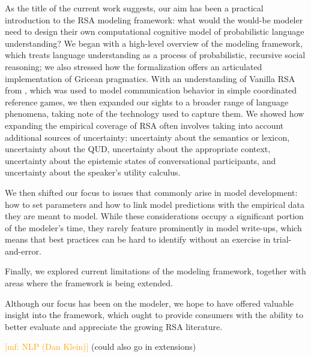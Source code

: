 \documentclass{sp}
\newcommand{\mf}[1]{\textcolor{orange}{[mf: #1]}}
\begin{document}
As the title of the current work suggests, our aim has been a practical introduction to the RSA modeling framework: what would the would-be modeler need to design their own computational cognitive model of probabilistic language understanding? We began with a high-level overview of the modeling framework, which treats language understanding as a process of probabilistic, recursive social reasoning; we also stressed how the formalization offers an articulated implementation of Gricean pragmatics. With an understanding of Vanilla RSA from \cite{frankgoodman2012}, which was used to model communication behavior in simple coordinated reference games, we then expanded our sights to a broader range of language phenomena, taking note of the technology used to capture them. We showed how expanding the empirical coverage of RSA often involves taking into account additional sources of uncertainty: uncertainty about the semantics or lexicon, uncertainty about the QUD, uncertainty about the appropriate context, uncertainty about the epistemic states of conversational participants, and uncertainty about the speaker's utility calculus.

We then shifted our focus to issues that commonly arise in model development: how to set parameters and how to link model predictions with the empirical data they are meant to model. While these considerations occupy a significant portion of the modeler's time, they rarely feature prominently in model write-ups, which means that best practices can be hard to identify without an exercise in trial-and-error.

Finally, we explored current limitations of the modeling framework, together with areas where the framework is being extended.

Although our focus has been on the modeler, we hope to have offered valuable insight into the framework, which ought to provide consumers with the ability to better evaluate and appreciate the growing RSA literature.


\mf{NLP (Dan Klein)} (could also go in extensions)






\end{document}
